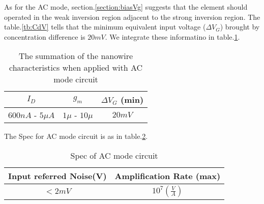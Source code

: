 As for the AC mode, section.\ref{section:biasVg} suggests that the element should operated in the weak inversion region adjacent to the strong inversion region.
The table.\ref{tb:CdV} tells that the minimum equivalent input voltage ($\Delta V_G$) brought by concentration difference is $20mV$.
We integrate these informatino in table.\ref{tb:ACinput}.
\begin{table}[!htbp]
    {\fontfamily{}\fontsize{10}{14}\selectfont
    \centering
    \begin{tabular}{c|c|c}
        $I_D$ & $g_m$ & $\Delta V_G$ (min)\\
        \hline
        $600n A$ - $5\mu A$ & $1\mu $ - $10\mu$ & $20mV$\\
    \end{tabular}
    \caption{The summation of the nanowire characteristics when applied with AC mode circuit}
    \label{tb:ACinput}
    }
\end{table}
The Spec for AC mode circuit is as in table.\ref{tb:ACSpec}.
\begin{table}[!htbp]
    {\fontfamily{}\fontsize{10}{14}\selectfont
    \centering
    \begin{tabular}{c|c}
        Input referred Noise(V) & Amplification Rate (max) \\
        \hline
        $< 2m V$ & $10^7(\frac{V}{A})$\\
    \end{tabular}
    \caption{Spec of AC mode circuit}
    \label{tb:ACSpec}
    }
\end{table}





 

